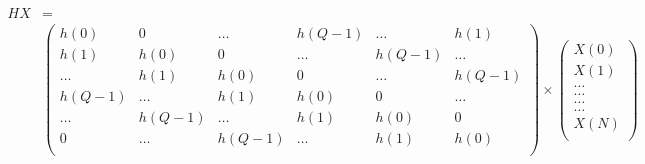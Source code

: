 \begin{equation*}
  \begin{aligned}
	HX&=\\ &
\begin{pmatrix}
h(0) & 0 & \ldots & h(Q-1) & \ldots & h(1)\\ 
h(1)&h(0) & 0 & \ldots & h(Q-1) & \ldots \\ 
\ldots &h(1)&h(0) & 0 & \ldots & h(Q-1) \\ 
h(Q-1)&\ldots &h(1)&h(0) & 0 & \ldots  \\ 
\ldots&h(Q-1)&\ldots &h(1)&h(0) & 0  \\ 
0&\ldots&h(Q-1)&\ldots &h(1)&h(0)   \\ 
\end{pmatrix}
\times 
\begin{pmatrix}
X(0)\\ 
X(1)\\
\ldots\\
\ldots\\
\ldots\\
\ldots\\
X(N)\\

\end{pmatrix}
  \end{aligned}
\end{equation*}
